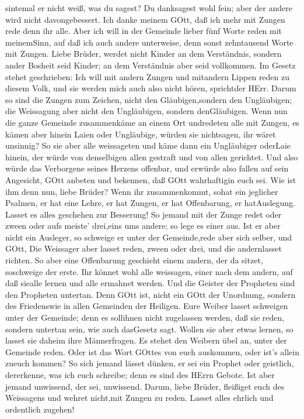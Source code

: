 sintemal er nicht weiß, was du sagest?  Du danksagest wohl
fein; aber der andere wird nicht davongebessert.  Ich danke
meinem GOtt, daß ich mehr mit Zungen rede denn ihr alle. 
Aber ich will in der Gemeinde lieber fünf Worte reden mit meinemSinn,
auf daß ich auch andere unterweise, denn sonst zehntausend Worte mit
Zungen.  Liebe Brüder, werdet nicht Kinder an dem
Verständnis, sondern ander Bosheit seid Kinder; an dem Verständnis aber
seid vollkommen.  Im Gesetz stehet geschrieben: Ich will
mit andern Zungen und mitandern Lippen reden zu diesem Volk, und sie
werden mich auch also nicht hören, sprichtder HErr.  Darum
so sind die Zungen zum Zeichen, nicht den Gläubigen,sondern den
Ungläubigen; die Weissagung aber nicht den Ungläubigen, sondern
denGläubigen.  Wenn nun die ganze Gemeinde zusammenkäme an
einem Ort undredeten alle mit Zungen, es kämen aber hinein Laien oder
Ungläubige, würden sie nichtsagen, ihr wäret unsinnig?  So
sie aber alle weissageten und käme dann ein Ungläubiger oderLaie hinein,
der würde von denselbigen allen gestraft und von allen gerichtet.
 Und also würde das Verborgene seines Herzens offenbar, und
erwürde also fallen auf sein Angesicht, GOtt anbeten und bekennen, daß
GOtt wahrhaftigin euch sei.  Wie ist ihm denn nun, liebe
Brüder? Wenn ihr zusammenkommt, sohat ein jeglicher Psalmen, er hat eine
Lehre, er hat Zungen, er hat Offenbarung, er hatAuslegung. Lasset es
alles geschehen zur Besserung!  So jemand mit der Zunge
redet oder zween oder aufs meiste' drei,eins ums andere; so lege es
einer aus.  Ist er aber nicht ein Ausleger, so schweige er
unter der Gemeinde,rede aber sich selber, und GOtt,  Die
Weissager aber lasset reden, zween oder drei, und die andernlasset
richten.  So aber eine Offenbarung geschieht einem andern,
der da sitzet, soschweige der erste.  Ihr könnet wohl alle
weissagen, einer nach dem andern, auf daß siealle lernen und alle
ermahnet werden.  Und die Geister der Propheten sind den
Propheten untertan.  Denn GOtt ist, nicht ein GOtt der
Unordnung, sondern des Friedenswie in allen Gemeinden der Heiligen.
 Eure Weiber lasset schweigen unter der Gemeinde; denn es
sollihnen nicht zugelassen werden, daß sie reden, sondern untertan sein,
wie auch dasGesetz sagt.  Wollen sie aber etwas lernen, so
lasset sie daheim ihre Männerfragen. Es stehet den Weibern übel an,
unter der Gemeinde reden.  Oder ist das Wort GOttes von
euch auskommen, oder ist's allein zueuch kommen?  So sich
jemand lässet dünken, er sei ein Prophet oder geistlich, dererkenne, was
ich euch schreibe; denn es sind des HErrn Gebote.  Ist aber
jemand unwissend, der sei, unwissend.  Darum, liebe Brüder,
fleißiget euch des Weissagens und wehret nicht,mit Zungen zu reden.
 Lasset alles ehrlich und ordentlich zugehen!

